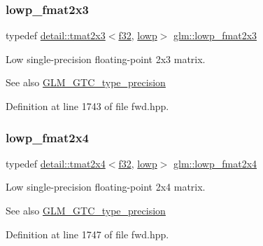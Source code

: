 \subsubsection{\texorpdfstring{lowp\+\_\+fmat2x3}{lowp\_fmat2x3}}
{\footnotesize\ttfamily typedef \hyperlink{structglm_1_1detail_1_1tmat2x3}{detail\+::tmat2x3}$<$\hyperlink{group__gtc__type__precision_ga0ec999b57f5330d9021256e96038df04}{f32}, \hyperlink{namespaceglm_a0f04f086094c747d227af4425893f545ae161af3fc695e696ce3bf69f7332bc2d}{lowp}$>$ \hyperlink{group__gtc__type__precision_ga01c5c29a6cee22c3e75de25c98dbecc9}{glm\+::lowp\+\_\+fmat2x3}}

Low single-\/precision floating-\/point 2x3 matrix. \begin{DoxySeeAlso}{See also}
\hyperlink{group__gtc__type__precision}{G\+L\+M\+\_\+\+G\+T\+C\+\_\+type\+\_\+precision} 
\end{DoxySeeAlso}


Definition at line 1743 of file fwd.\+hpp.

\mbox{\label{group__gtc__type__precision_ga14b4460b2132fd3db19b53ec6f9353f2}} 
\subsubsection{\texorpdfstring{lowp\+\_\+fmat2x4}{lowp\_fmat2x4}}
{\footnotesize\ttfamily typedef \hyperlink{structglm_1_1detail_1_1tmat2x4}{detail\+::tmat2x4}$<$\hyperlink{group__gtc__type__precision_ga0ec999b57f5330d9021256e96038df04}{f32}, \hyperlink{namespaceglm_a0f04f086094c747d227af4425893f545ae161af3fc695e696ce3bf69f7332bc2d}{lowp}$>$ \hyperlink{group__gtc__type__precision_ga14b4460b2132fd3db19b53ec6f9353f2}{glm\+::lowp\+\_\+fmat2x4}}

Low single-\/precision floating-\/point 2x4 matrix. \begin{DoxySeeAlso}{See also}
\hyperlink{group__gtc__type__precision}{G\+L\+M\+\_\+\+G\+T\+C\+\_\+type\+\_\+precision} 
\end{DoxySeeAlso}


Definition at line 1747 of file fwd.\+hpp.

\mbox{\label{group__gtc__type__precision_ga88ae00cab6aae48d56700915c7799973}} 

